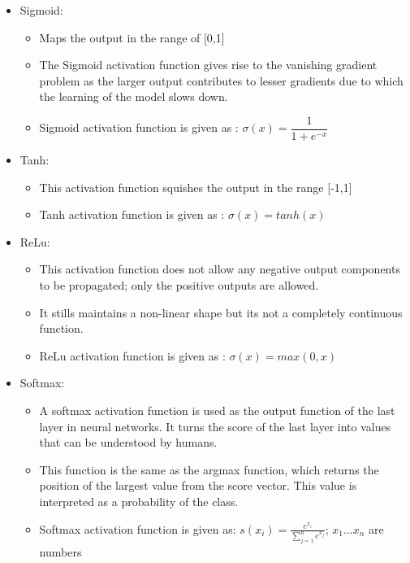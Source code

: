 \begin{itemize}
    \item Sigmoid: \begin{itemize}
        \item Maps the output in the range of [0,1]
        \item The Sigmoid activation function gives rise to the vanishing gradient problem as the larger output contributes to lesser gradients due to which the learning of the model slows down. 
        \item Sigmoid activation function is given as :
        $ \sigma(x) = \dfrac{1}{1 + e^{-x}}$
    \end{itemize} 
    \newpage
    \item Tanh: \begin{itemize}
        \item This activation function squishes the output in the range [-1,1]
        \item Tanh activation function is given as :
        $ \sigma(x) = tanh(x)$
    \end{itemize}
    \item ReLu: \begin{itemize}
        \item This activation function does not allow any negative output components to be propagated; only the positive outputs are allowed. 
        \item It stills maintains a non-linear shape but its not a completely continuous function.
        \item ReLu activation function is given as :
        $\sigma(x) = max(0,x)$
    \end{itemize}
    \item Softmax: 
    \begin{itemize}
        \item A softmax activation function is used as the output function of the last layer in neural networks. It turns the score of the last layer into values that can be understood by humans.
         \item This function is the same as the argmax function, which returns the position of the largest value from the score vector. This value is interpreted as a probability of the class. 
        \item Softmax activation function is given as: 
        $s (x_i) = \frac{e^{x_i}}{ \sum\nolimits_{j=1}^{n}e^{x_j}}$; 
        $x_1...x_n$ are numbers
    \end{itemize}  
    
    
\end{itemize}

